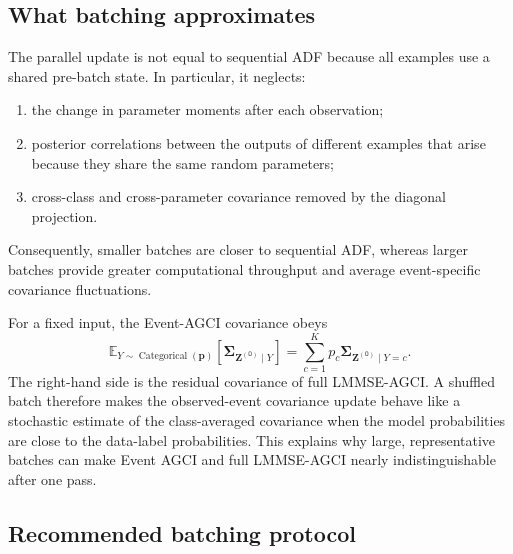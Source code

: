 \documentclass[11pt]{article}
\newcommand{\E}{\mathbb{E}}
\newcommand{\Olayer}{\mathtt{O}}
\begin{document}
\subsection{What batching approximates}

The parallel update is not equal to sequential ADF because all examples use a
shared pre-batch state.  In particular, it neglects:
\begin{enumerate}
 \item the change in parameter moments after each observation;
 \item posterior correlations between the outputs of different examples that
 arise because they share the same random parameters;
 \item cross-class and cross-parameter covariance removed by the diagonal
 projection.
\end{enumerate}
Consequently, smaller batches are closer to sequential ADF, whereas larger
batches provide greater computational throughput and average event-specific
covariance fluctuations.

For a fixed input, the Event-AGCI covariance obeys
\begin{equation}
 \E_{Y\sim\operatorname{Categorical}(\bm p)}
 \left[
 \bm\Sigma_{\bm Z^{(\Olayer)}\mid Y}
 \right]
 =
 \sum_{c=1}^{K}p_c
 \bm\Sigma_{\bm Z^{(\Olayer)}\mid Y=c}.
 \label{eq:event-covariance-average}
\end{equation}
The right-hand side is the residual covariance of full LMMSE-AGCI.  A shuffled
batch therefore makes the observed-event covariance update behave like a
stochastic estimate of the class-averaged covariance when the model
probabilities are close to the data-label probabilities.  This explains why
large, representative batches can make Event AGCI and full LMMSE-AGCI nearly
indistinguishable after one pass.

\subsection{Recommended batching protocol}
\end{document}
